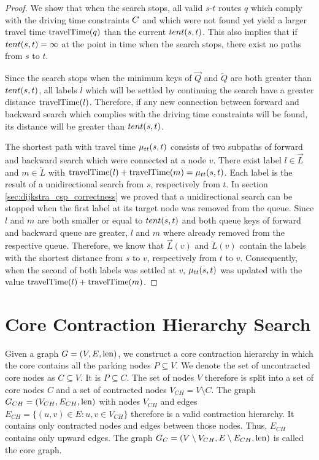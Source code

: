 \begin{proof}
	We show that when the search stops, all valid $s$-$t$ routes $q$ which comply with the driving time constraints $C$ and which were not found yet yield a larger travel time $\operatorname{travelTime}(q)$ than the current $tent(s,t)$. This also implies that if $tent(s,t) = \infty$ at the point in time when the search stops, there exist no paths from $s$ to $t$.

	Since the search stops when the minimum keys of $\overrightarrow{Q}$ and $\overleftarrow{Q}$ are both greater than $tent(s,t)$, all labels $l$ which will be settled by continuing the search have a greater distance $\operatorname{travelTime}(l)$. Therefore, if any new connection between forward and backward search which complies with the driving time constraints will be found, its distance will be greater than $tent(s,t)$.

	The shortest path with travel time $\mu_{tt}(s,t)$ consists of two subpaths of forward and backward search which were connected at a node $v$. There exist label $l \in \overrightarrow{L}$ and $m \in \overleftarrow{L}$ with $\operatorname{travelTime}(l) + \operatorname{travelTime}(m) = \mu_{tt}(s,t)$. Each label is the result of a unidirectional search from $s$, respectively from $t$. In section \ref{sec:dijkstra_csp_correctness} we proved that a unidirectional search can be stopped when the first label at its target node was removed from the queue. Since $l$ and $m$ are both smaller or equal to $tent(s,t)$ and both queue keys of forward and backward queue are greater, $l$ and $m$ where already removed from the respective queue. Therefore, we know that $\overrightarrow{L}(v)$ and $\overleftarrow{L}(v)$ contain the labels with the shortest distance from $s$ to $v$, respectively from $t$ to $v$. Consequently, when the second of both labels was settled at $v$, $\mu_{tt}(s,t)$ was updated with the value $\operatorname{travelTime}(l) + \operatorname{travelTime}(m)$.
\end{proof}

\section{Core Contraction Hierarchy Search}
Given a graph $G = (V,E,\operatorname{len})$, we construct a core contraction hierarchy in which the core contains all the parking nodes $P \subseteq V$. We denote the set of uncontracted core nodes as $C \subseteq V$. It is $P \subseteq C$. The set of nodes $V$ therefore is split into a set of core nodes $C$ and a set of contracted nodes $V_{CH} = V \setminus C$. The graph $G_{CH} = (V_{CH},E_{CH},\operatorname{len})$ with nodes $V_{CH}$ and edges $E_{CH} = \{(u,v) \in E : u,v \in V_{CH}\}$ therefore is a valid contraction hierarchy. It contains only contracted nodes and edges between those nodes. Thus, $E_{CH}$ contains only upward edges. The graph $G_{C} = (V \setminus V_{CH},E \setminus E_{CH},\operatorname{len})$ is called the core graph.

